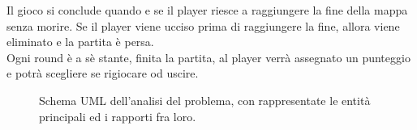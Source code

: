 \textsf{\small Il gioco si conclude quando e se il player riesce a raggiungere la fine della mappa senza morire.}
\textsf{\small Se il player viene ucciso prima di raggiungere la fine, allora viene eliminato e la partita è persa.}\\

\textsf{\small Ogni round è a sè stante, finita la partita, al player verrà assegnato un punteggio e potrà scegliere se rigiocare od uscire.}\\


	\begin{figure}[h]
		\centering{}
		\caption{Schema UML dell'analisi del problema, con rappresentate le entità principali ed i rapporti fra loro.}
		\label{img:analysis}
	\end{figure}

